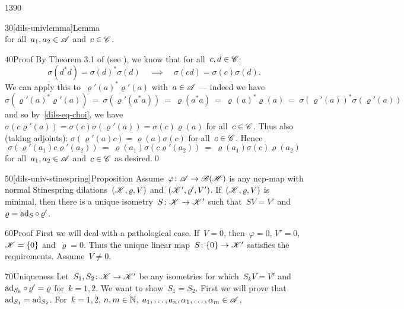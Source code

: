 \begin{parsec}{1390}
\begin{point}{30}[dils-univlemma]{Lemma}
\begin{equation*}
\end{equation*}
    for all~$a_1,a_2 \in \mathscr{A}$ and~$c \in \mathscr{C}$.
\begin{point}{40}{Proof}%
By Theorem 3.1 of \cite{choi} (see ),
we know that for all~$c,d\in\mathscr{C}$:
\begin{equation}
    \sigma(d^*d) = \sigma(d)^*\sigma(d) \quad \implies \quad
    \sigma(cd) = \sigma(c)\sigma(d).\label{dils-eq-choi}
\end{equation}
We can apply this to~$\varrho'(a)^*\varrho'(a)$
with~$a \in \mathscr{A}$ --- indeed we have
\begin{equation*}
\sigma(\varrho'(a)^* \varrho'(a))
  \   =\ \sigma(\varrho'(a^*a))
  \  =\ \varrho(a^*a)
  \  =\ \varrho(a)^*\varrho(a)
  \  =\ \sigma(\varrho'(a))^*\sigma(\varrho'(a))
\end{equation*}
and so by~\eqref{dils-eq-choi},
    we have~$\sigma(c\varrho'(a))
        = \sigma(c)\sigma(\varrho'(a)) = \sigma(c)\varrho(a)$
        for all~$c \in \mathscr{C}$.
Thus also (taking adjoints):
$\sigma(\varrho'(a)c) = \varrho(a)\sigma(c)$ for all~$c \in \mathscr{C}$.
Hence
\begin{equation*}
\sigma(\varrho'(a_1)c\varrho'(a_2))
            \ =\  \varrho(a_1)\sigma(c \varrho'(a_2))
            \ =\  \varrho(a_1) \sigma(c) \varrho(a_2)
\end{equation*}
    for all~$a_1,a_2 \in \mathscr{A}$ and~$c\in \mathscr{C}$ as desired.\qed
\end{point}
\end{point}
\begin{point}{50}[dils-univ-stinespring]{Proposition}%
    Assume~$\varphi\colon \mathscr{A} \to \mathscr{B}(\mathscr{H})$
        is any ncp-map with normal
        Stinespring dilations~$(\mathscr{K}, \varrho, V)$
    and~$(\mathscr{K}', \varrho', V')$.
        If~$(\mathscr{K},\varrho,V)$ is minimal,
        then there is a unique isometry~$S\colon \mathscr{K} \to \mathscr{K}'$
        such that~$SV=V'$ and~$\varrho = \mathrm{ad}_S\mathop{\circ} \varrho'$.
\begin{point}{60}{Proof}
First we will deal with a pathological case.
If~$V = 0$, then~$\varphi = 0$, $V' = 0$, $\mathscr{K} = \{0\}$
and~$\varrho = 0$.  Thus the unique linear map~$S\colon \{0\} \to \mathscr{K}'$
satisfies the requirements.  Assume~$V \neq 0$.
\begin{point}{70}{Uniqueness}%
Let~$S_1,S_2\colon \mathscr{K} \to \mathscr{K}'$
be any isometries for which~$S_k V = V'$ and~$\mathrm{ad}_{S_k} \mathop{\circ} \varrho' = \varrho$
for~$k =1,2$.
We want to show~$S_1=S_2$.
First we will prove that~$\mathrm{ad}_{S_1} = \mathrm{ad}_{S_2}$.
For~$k=1,2$, $n, m\in \mathbb{N}$, $a_1, \ldots, a_n,\alpha_1, \ldots, \alpha_m \in \mathscr{A}$,

\end{point}
\end{point}
\end{point}
\end{parsec}
